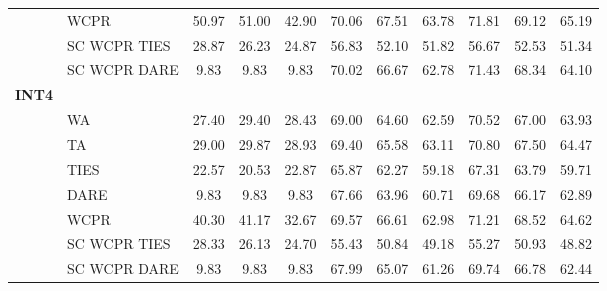 \begin{table}[t]
{\begin{tabular}{llccc|ccc|ccc}
 & WCPR & 50.97 & 51.00 & 42.90 & 70.06 & 67.51 & 63.78 & 71.81 & 69.12 & 65.19 \\
 & SC WCPR TIES & 28.87 & 26.23 & 24.87 & 56.83 & 52.10 & 51.82 & 56.67 & 52.53 & 51.34 \\
 & SC WCPR DARE & 9.83 & 9.83 & 9.83 & 70.02 & 66.67 & 62.78 & 71.43 & 68.34 & 64.10 \\
\midrule
\textbf{ INT4 } & \multicolumn{10}{c}{} \\
 & WA & 27.40 & 29.40 & 28.43 & 69.00 & 64.60 & 62.59 & 70.52 & 67.00 & 63.93 \\
 & TA & 29.00 & 29.87 & 28.93 & 69.40 & 65.58 & 63.11 & 70.80 & 67.50 & 64.47 \\
 & TIES & 22.57 & 20.53 & 22.87 & 65.87 & 62.27 & 59.18 & 67.31 & 63.79 & 59.71 \\
 & DARE & 9.83 & 9.83 & 9.83 & 67.66 & 63.96 & 60.71 & 69.68 & 66.17 & 62.89 \\
 & WCPR & 40.30 & 41.17 & 32.67 & 69.57 & 66.61 & 62.98 & 71.21 & 68.52 & 64.62 \\
 & SC WCPR TIES & 28.33 & 26.13 & 24.70 & 55.43 & 50.84 & 49.18 & 55.27 & 50.93 & 48.82 \\
 & SC WCPR DARE & 9.83 & 9.83 & 9.83 & 67.99 & 65.07 & 61.26 & 69.74 & 66.78 & 62.44 \\
\bottomrule
\end{tabular}%
}
\end{table}